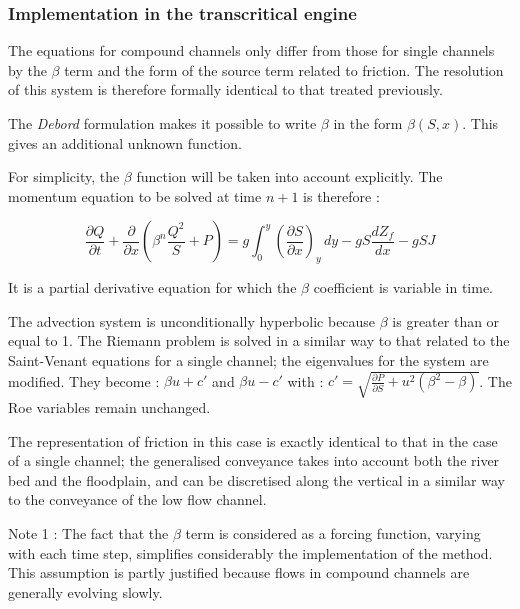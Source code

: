 \subsubsection{Implementation in the transcritical engine}

The equations for compound channels only differ from those for single channels by the $\beta$ term and the form of the source term related to friction. The resolution of this system is therefore formally identical to that treated previously.

The \emph{Debord} formulation makes it possible to write $\beta$ in the form $\beta(S,x)$. This gives an additional unknown function.

For simplicity, the $\beta$ function will be taken into account explicitly. The momentum equation to be solved at time $n+1$ is therefore :

\begin{equation}
 \frac{\partial Q}{\partial t} + \frac{\partial}{\partial x} \left ( \beta^n \frac{Q^2}{S} + P \right ) = g \int_{0}^y \left ( \frac{\partial S}{\partial x} \right )_y \, dy - g S \frac{d Z_f}{dx} -g S J
\end{equation}

It is a partial derivative equation for which the $\beta$ coefficient is variable in time.

The advection system is unconditionally hyperbolic because $\beta$ is greater than or equal to 1. The Riemann problem is solved in a similar way to that related to the Saint-Venant equations for a single channel; the eigenvalues for the system are modified. They become : $\beta u + c'$ and $\beta u - c'$ with : $c' = \sqrt{\frac{\partial P}{\partial S} + u^2(\beta^2 - \beta)}$. The Roe variables remain unchanged.

The representation of friction in this case is exactly identical to that in the case of a single channel; the generalised conveyance takes into account both the river bed and the floodplain, and can be discretised along the vertical in a similar way to the conveyance of the low flow channel.

\begin{CommentBlock}{Note 1 :}
The fact that the $\beta$ term is considered as a forcing function, varying with each time step, simplifies considerably the implementation of the method. This assumption is partly justified because flows in compound channels are generally evolving slowly.
\end{CommentBlock}

